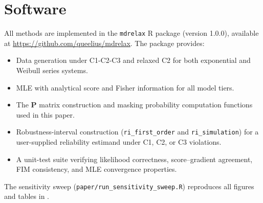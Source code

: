 \section{Software}
\label{app:software}

All methods are implemented in the \texttt{mdrelax} R package (version 1.0.0),
available at \url{https://github.com/queelius/mdrelax}. The package provides:
\begin{itemize}
    \item Data generation under C1-C2-C3 and relaxed C2 for both
        exponential and Weibull series systems.
    \item MLE with analytical score and Fisher information for all model tiers.
    \item The $\mathbf{P}$ matrix construction and masking probability
        computation functions used in this paper.
    \item Robustness-interval construction (\texttt{ri\_first\_order} and
        \texttt{ri\_simulation}) for a user-supplied reliability estimand
        under C1, C2, or C3 violations.
    \item A unit-test suite verifying likelihood correctness, score--gradient
        agreement, FIM consistency, and MLE convergence properties.
\end{itemize}

The sensitivity sweep (\texttt{paper/run\_sensitivity\_sweep.R}) reproduces
all figures and tables in .
